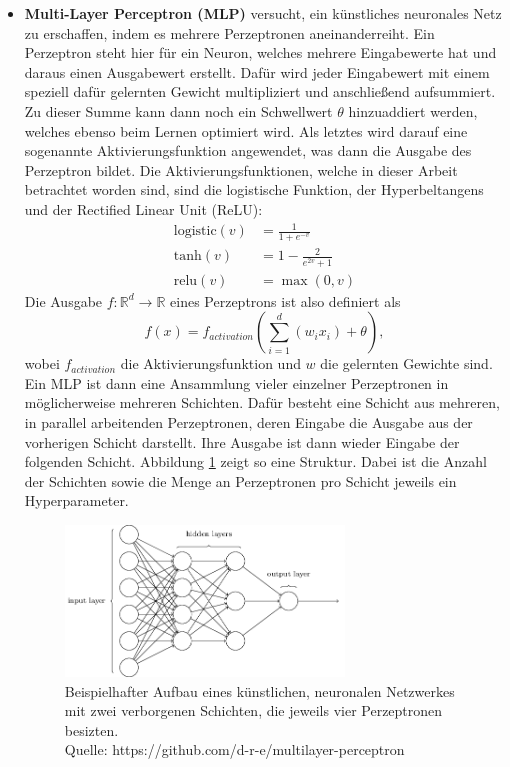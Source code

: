 \begin{itemize}
   \item \textbf{Multi-Layer Perceptron (MLP)} versucht, ein künstliches neuronales Netz zu erschaffen, indem es
    mehrere Perzeptronen aneinanderreiht. Ein Perzeptron steht hier für ein Neuron, welches mehrere Eingabewerte
    hat und daraus einen Ausgabewert erstellt. Dafür wird jeder Eingabewert mit einem speziell dafür gelernten
    Gewicht multipliziert und anschließend aufsummiert. Zu dieser Summe kann dann noch ein Schwellwert $\theta$
    hinzuaddiert werden, welches ebenso beim Lernen optimiert wird. Als letztes wird darauf eine sogenannte
    Aktivierungsfunktion angewendet, was dann die Ausgabe des Perzeptron bildet. Die Aktivierungsfunktionen,
    welche in dieser Arbeit betrachtet worden sind, sind die logistische Funktion, der Hyperbeltangens und der
    Rectified Linear Unit (ReLU):
    \begin{align}
        \text{logistic}(v) &= \frac{1}{1+e^{-v}}\\
        \text{tanh}(v)     &= 1-\frac{2}{e^{2v}+1}\\
        \text{relu}(v)     &= \max(0, v)
    \end{align}
    Die Ausgabe $f : \mathbb{R}^d \rightarrow \mathbb{R}$ eines Perzeptrons ist also definiert als
    \begin{equation}
            f(x) = f_{activation}(\sum_{i=1}^d(w_ix_i)+\theta),
    \end{equation}
    wobei $f_{activation}$ die Aktivierungsfunktion und $w$ die gelernten Gewichte sind. Ein MLP ist dann eine
    Ansammlung vieler einzelner Perzeptronen in möglicherweise mehreren Schichten. Dafür besteht eine Schicht
    aus mehreren, in parallel arbeitenden Perzeptronen, deren Eingabe die Ausgabe aus der vorherigen Schicht
    darstellt. Ihre Ausgabe ist dann wieder Eingabe der folgenden Schicht. Abbildung \ref{fig:theory-mlp} zeigt so
    eine Struktur. Dabei ist die Anzahl der Schichten sowie die Menge an Perzeptronen pro Schicht jeweils ein
    Hyperparameter.

    \begin{figure}
        \centering
        \includegraphics[width=0.7\textwidth]{res/theory-mlp}
        \caption{Beispielhafter Aufbau eines künstlichen, neuronalen Netzwerkes mit zwei verborgenen Schichten, die
            jeweils vier Perzeptronen besizten.\\ Quelle: https://github.com/d-r-e/multilayer-perceptron}
        \label{fig:theory-mlp}
    \end{figure}


\end{itemize}
